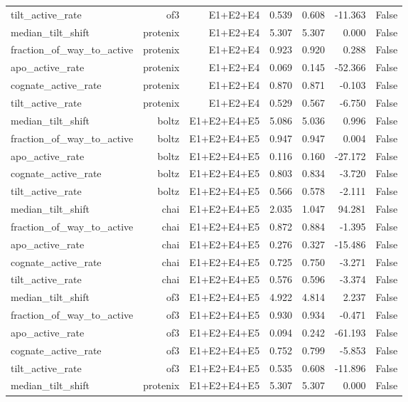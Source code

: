 \begin{table}[htbp]
\begin{tabular}{lrrrrrr}
tilt\_active\_rate & of3 & E1+E2+E4 & 0.539 & 0.608 & -11.363 & False \\
median\_tilt\_shift & protenix & E1+E2+E4 & 5.307 & 5.307 & 0.000 & False \\
fraction\_of\_way\_to\_active & protenix & E1+E2+E4 & 0.923 & 0.920 & 0.288 & False \\
apo\_active\_rate & protenix & E1+E2+E4 & 0.069 & 0.145 & -52.366 & False \\
cognate\_active\_rate & protenix & E1+E2+E4 & 0.870 & 0.871 & -0.103 & False \\
tilt\_active\_rate & protenix & E1+E2+E4 & 0.529 & 0.567 & -6.750 & False \\
median\_tilt\_shift & boltz & E1+E2+E4+E5 & 5.086 & 5.036 & 0.996 & False \\
fraction\_of\_way\_to\_active & boltz & E1+E2+E4+E5 & 0.947 & 0.947 & 0.004 & False \\
apo\_active\_rate & boltz & E1+E2+E4+E5 & 0.116 & 0.160 & -27.172 & False \\
cognate\_active\_rate & boltz & E1+E2+E4+E5 & 0.803 & 0.834 & -3.720 & False \\
tilt\_active\_rate & boltz & E1+E2+E4+E5 & 0.566 & 0.578 & -2.111 & False \\
median\_tilt\_shift & chai & E1+E2+E4+E5 & 2.035 & 1.047 & 94.281 & False \\
fraction\_of\_way\_to\_active & chai & E1+E2+E4+E5 & 0.872 & 0.884 & -1.395 & False \\
apo\_active\_rate & chai & E1+E2+E4+E5 & 0.276 & 0.327 & -15.486 & False \\
cognate\_active\_rate & chai & E1+E2+E4+E5 & 0.725 & 0.750 & -3.271 & False \\
tilt\_active\_rate & chai & E1+E2+E4+E5 & 0.576 & 0.596 & -3.374 & False \\
median\_tilt\_shift & of3 & E1+E2+E4+E5 & 4.922 & 4.814 & 2.237 & False \\
fraction\_of\_way\_to\_active & of3 & E1+E2+E4+E5 & 0.930 & 0.934 & -0.471 & False \\
apo\_active\_rate & of3 & E1+E2+E4+E5 & 0.094 & 0.242 & -61.193 & False \\
cognate\_active\_rate & of3 & E1+E2+E4+E5 & 0.752 & 0.799 & -5.853 & False \\
tilt\_active\_rate & of3 & E1+E2+E4+E5 & 0.535 & 0.608 & -11.896 & False \\
median\_tilt\_shift & protenix & E1+E2+E4+E5 & 5.307 & 5.307 & 0.000 & False \\

\end{tabular}
\end{table}
